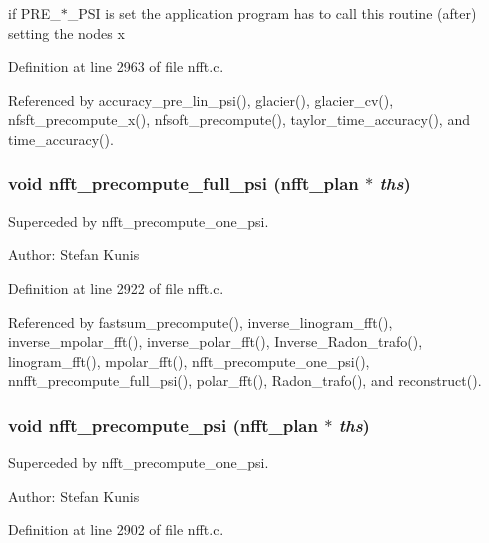 if PRE\_\-$\ast$\_\-PSI is set the application program has to call this routine (after) setting the nodes x 

Definition at line 2963 of file nfft.c.

Referenced by accuracy\_\-pre\_\-lin\_\-psi(), glacier(), glacier\_\-cv(), nfsft\_\-precompute\_\-x(), nfsoft\_\-precompute(), taylor\_\-time\_\-accuracy(), and time\_\-accuracy().\hypertarget{group__nfft_gee7a88956c66b2113014084d6dd04b3a}{
\subsubsection{\setlength{\rightskip}{0pt plus 5cm}void nfft\_\-precompute\_\-full\_\-psi ({\bf nfft\_\-plan} $\ast$ {\em ths})}}
\label{group__nfft_gee7a88956c66b2113014084d6dd04b3a}


Superceded by nfft\_\-precompute\_\-one\_\-psi. 

\begin{Desc}
\item[Author:]Stefan Kunis \end{Desc}


Definition at line 2922 of file nfft.c.

Referenced by fastsum\_\-precompute(), inverse\_\-linogram\_\-fft(), inverse\_\-mpolar\_\-fft(), inverse\_\-polar\_\-fft(), Inverse\_\-Radon\_\-trafo(), linogram\_\-fft(), mpolar\_\-fft(), nfft\_\-precompute\_\-one\_\-psi(), nnfft\_\-precompute\_\-full\_\-psi(), polar\_\-fft(), Radon\_\-trafo(), and reconstruct().\hypertarget{group__nfft_ge6a8367b03fd75b2af42dbbaccb78bf2}{
\subsubsection{\setlength{\rightskip}{0pt plus 5cm}void nfft\_\-precompute\_\-psi ({\bf nfft\_\-plan} $\ast$ {\em ths})}}
\label{group__nfft_ge6a8367b03fd75b2af42dbbaccb78bf2}


Superceded by nfft\_\-precompute\_\-one\_\-psi. 

\begin{Desc}
\item[Author:]Stefan Kunis \end{Desc}


Definition at line 2902 of file nfft.c.

